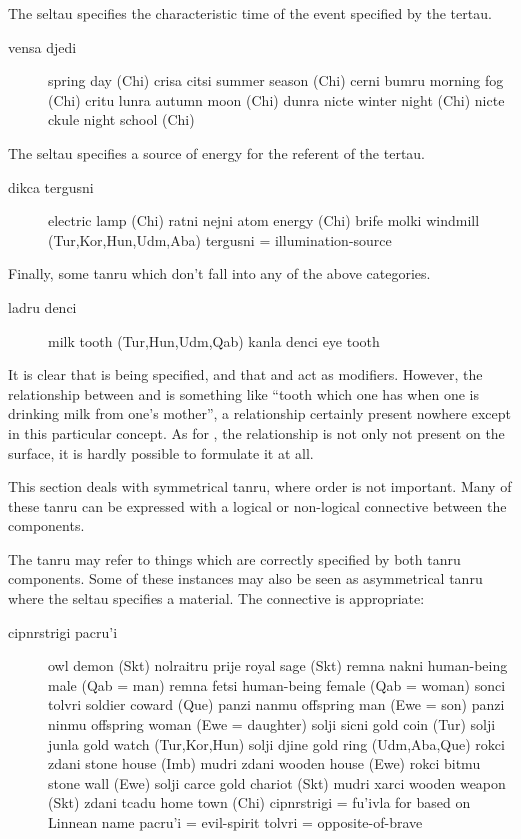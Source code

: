 The seltau specifies the characteristic time of the event
    specified by the tertau. 
\begin{description}
\item[vensa djedi] spring day (Chi) crisa citsi summer season (Chi) cerni bumru morning fog (Chi) critu lunra autumn moon (Chi) dunra nicte winter night (Chi) nicte ckule night school (Chi)
\end{description}

The seltau specifies a source of energy for the referent of the
    tertau. 
\begin{description}
\item[dikca tergusni] electric lamp (Chi) ratni nejni atom energy (Chi) brife molki windmill (Tur,Kor,Hun,Udm,Aba) tergusni = illumination-source
\end{description}

Finally, some tanru which don't fall into any of the above
    categories. 
\begin{description}
\item[ladru denci] milk tooth (Tur,Hun,Udm,Qab) kanla denci eye tooth

\end{description}

It is clear that  is being specified, and that
     and  act as modifiers. However, the
    relationship between  and  is something like
    ``tooth which one has when one is drinking milk from one's
    mother'', a relationship certainly present nowhere except in
    this particular concept. As for , the
    relationship is not only not present on the surface, it is
    hardly possible to formulate it at all.



This section deals with symmetrical tanru, where order is
    not important. Many of these tanru can be expressed with a
    logical or non-logical connective between the components.

The tanru may refer to things which are correctly specified
    by both tanru components. Some of these instances may also be
    seen as asymmetrical tanru where the seltau specifies a
    material. The connective  is appropriate:
\begin{description}
\item[cipnrstrigi pacru'i] owl demon (Skt) nolraitru prije royal sage (Skt) remna nakni human-being male (Qab = man) remna fetsi human-being female (Qab = woman) sonci tolvri soldier coward (Que) panzi nanmu offspring man (Ewe = son) panzi ninmu offspring woman (Ewe = daughter) solji sicni gold coin (Tur) solji junla gold watch (Tur,Kor,Hun) solji djine gold ring (Udm,Aba,Que) rokci zdani stone house (Imb) mudri zdani wooden house (Ewe) rokci bitmu stone wall (Ewe) solji carce gold chariot (Skt) mudri xarci wooden weapon (Skt) zdani tcadu home town (Chi) cipnrstrigi = fu'ivla for  based on Linnean name pacru'i = evil-spirit tolvri = opposite-of-brave
\end{description}

